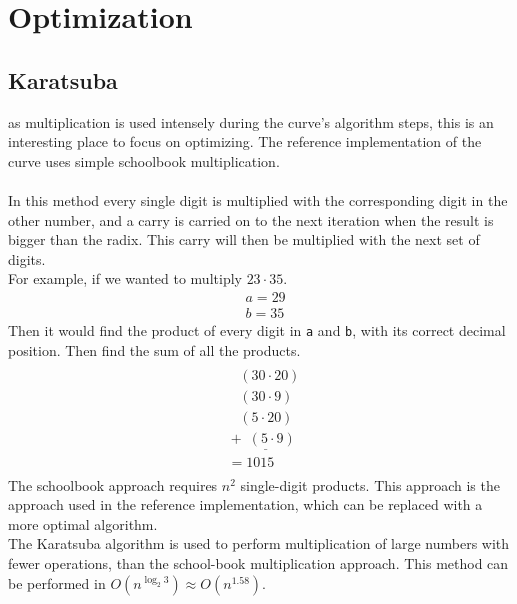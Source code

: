\section{Optimization}

\subsection{Karatsuba}
as multiplication is used intensely during the curve's algorithm steps, this is an interesting place to focus on optimizing. The reference implementation of the curve uses simple schoolbook multiplication.\\
\\
In this method every single digit is multiplied with the corresponding digit in the other number, and a carry is carried on to the next iteration when the result is bigger than the radix. This carry will then be multiplied with the next set of digits.\\
For example, if we wanted to multiply $23 \cdot 35$.
\begin{equation*}
    \begin{split}
        & a = 29\\
        & b = 35
    \end{split}
\end{equation*}
Then it would find the product of every digit in \texttt{a} and \texttt{b}, with its correct decimal position. Then find the sum of all the products.
\begin{equation*}
    \begin{split}
        \\
       &\;\;\;\;(30 \cdot 20)\\
       &\;\;\;\;(30 \cdot 9)\\
       &\;\;\;\;(5 \cdot 20)\\
       &\underline{\;+ \; (5 \cdot 9)\;\;\;}\\
       &\; = 1015\\
    \end{split}
\end{equation*}
The schoolbook approach requires $n^{2}$ single-digit products. 
This approach is the approach used in the reference implementation, which can be replaced with a more optimal algorithm.\medskip
\\
\label{karat-opti}The Karatsuba algorithm is used to perform multiplication of large numbers with fewer operations, than the school-book multiplication approach. This method can be performed in $O(n^{\log_{2}3}) \approx O(n^{1.58})$.
